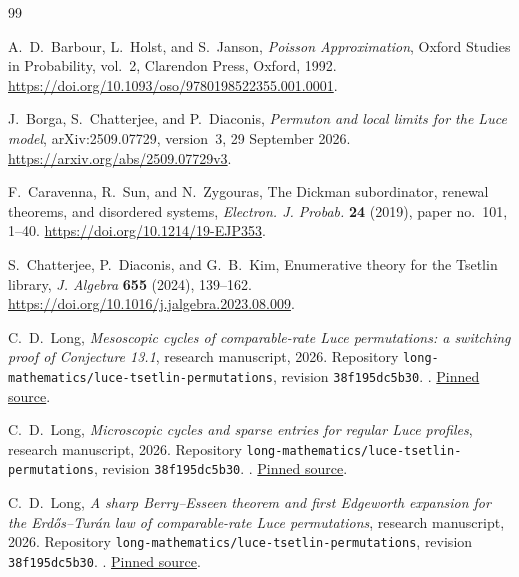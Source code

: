 \documentclass[11pt]{article}
\numberwithin{equation}{section}
\theoremstyle{definition}
\theoremstyle{remark}
\begin{document}
\begin{thebibliography}{99}
\small\raggedright
\setlength{\itemsep}{3pt}

A.~D.~Barbour, L.~Holst, and S.~Janson,
\emph{Poisson Approximation},
Oxford Studies in Probability, vol.~2, Clarendon Press, Oxford, 1992.
\url{https://doi.org/10.1093/oso/9780198522355.001.0001}.

J.~Borga, S.~Chatterjee, and P.~Diaconis,
\emph{Permuton and local limits for the Luce model},
arXiv:2509.07729, version~3, 29 September 2026.
\url{https://arxiv.org/abs/2509.07729v3}.

F.~Caravenna, R.~Sun, and N.~Zygouras,
The Dickman subordinator, renewal theorems, and disordered systems,
\emph{Electron. J. Probab.} \textbf{24} (2019), paper no.~101, 1--40.
\url{https://doi.org/10.1214/19-EJP353}.

S.~Chatterjee, P.~Diaconis, and G.~B.~Kim,
Enumerative theory for the Tsetlin library,
\emph{J. Algebra} \textbf{655} (2024), 139--162.
\url{https://doi.org/10.1016/j.jalgebra.2023.08.009}.

C.~D.~Long,
\emph{Mesoscopic cycles of comparable-rate Luce permutations: a switching proof of Conjecture 13.1},
research manuscript, 2026.
Repository \texttt{long-mathematics/luce-tsetlin-permutations},
revision \texttt{38f195dc5b30}.
.
\href{https://github.com/long-mathematics/luce-tsetlin-permutations/blob/38f195dc5b30812ebbf084764016e857a68b9a1c/papers/mesoscopic-switching/mesoscopic-luce-cycles.tex}{Pinned source}.

C.~D.~Long,
\emph{Microscopic cycles and sparse entries for regular Luce profiles},
research manuscript, 2026.
Repository \texttt{long-mathematics/luce-tsetlin-permutations},
revision \texttt{38f195dc5b30}.
.
\href{https://github.com/long-mathematics/luce-tsetlin-permutations/blob/38f195dc5b30812ebbf084764016e857a68b9a1c/papers/regular-profile-cycles/regular-profile-cycles.tex}{Pinned source}.

C.~D.~Long,
\emph{A sharp Berry--Esseen theorem and first Edgeworth expansion for the Erd\H{o}s--Tur\'an law of comparable-rate Luce permutations},
research manuscript, 2026.
Repository \texttt{long-mathematics/luce-tsetlin-permutations},
revision \texttt{38f195dc5b30}.
.
\href{https://github.com/long-mathematics/luce-tsetlin-permutations/blob/38f195dc5b30812ebbf084764016e857a68b9a1c/papers/sharp-order-edgeworth/luce-edgeworth.tex}{Pinned source}.


\end{thebibliography}
\end{document}
